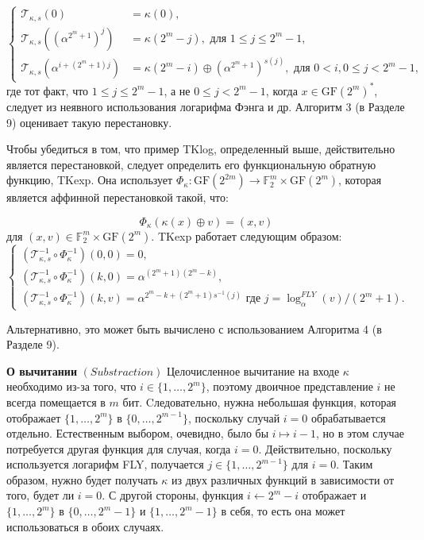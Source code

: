 $$
\begin{cases}
  \mathscr{T}_{\kappa, s}(0) & =\kappa(0), \\
  \mathscr{T}_{\kappa, s}\left(\left(\alpha^{2^m+1}\right)^j\right) & =\kappa\left(2^m-j\right), \text { для } 1 \leq j \leq 2^m-1, \\
  \mathscr{T}_{\kappa, s}\left(\alpha^{i+\left(2^m+1\right) j}\right) & =\kappa\left(2^m-i\right) \oplus\left(\alpha^{2^m+1}\right)^{s(j)}, \text { для } 0<i, 0 \leq j<2^m-1,
\end{cases}
$$ где тот факт, что \(1 \leq j \leq 2^m - 1\), а не \(0 \leq j < 2^m - 1\), когда \(x \in \mathrm{GF}(2^m)^*\), следует из неявного использования логарифма Фэнга и др. Алгоритм 3 (в Разделе 9) оценивает такую перестановку.

Чтобы убедиться в том, что пример TKlog, определенный выше, действительно является перестановкой, следует определить его функциональную обратную функцию, TKexp. Она использует \(\Phi_\kappa: \text{GF}(2^{2m}) \rightarrow \mathbb{F}^m_2 \times \text{GF}(2^m)\), которая является аффинной перестановкой такой, что:

\[
\Phi_\kappa(\kappa(x) \oplus v) = (x, v)
\] для \((x, v) \in \mathbb{F}^m_2 \times \text{GF}(2^m)\). TKexp работает следующим образом:
$$
\left\{\begin{array}{l}
  \left(\mathscr{T}_{\kappa, s}^{-1} \circ \Phi_\kappa^{-1}\right)(0,0)=0, \\
  \left(\mathscr{T}_{\kappa, s}^{-1} \circ \Phi_\kappa^{-1}\right)(k, 0)=\alpha^{\left(2^m+1\right)\left(2^m-k\right)}, \\
  \left(\mathscr{T}_{\kappa, s}^{-1} \circ \Phi_\kappa^{-1}\right)(k, v)=\alpha^{2^m-k+\left(2^m+1\right) s^{-1}(j)} \text { где } j=\log _\alpha^{F L Y}(v) /\left(2^m+1\right) .
  \end{array}\right.
$$

Альтернативно, это может быть вычислено с использованием Алгоритма 4 (в Разделе 9).

\textbf{О вычитании} \((Substraction)\) Целочисленное вычитание на входе \(\kappa\) необходимо из-за того, что \(i \in \{1, \ldots, 2^m\}\), поэтому двоичное представление \(i\) не всегда помещается в \(m\) бит. Cледовательно, нужна небольшая функция, которая отображает \(\{1, \ldots, 2^m\}\) в \(\{0, \ldots, 2^{m - 1}\}\), поскольку случай \(i = 0\) обрабатывается отдельно. Естественным выбором, очевидно, было бы \(i \mapsto i - 1\), но в этом случае потребуется другая функция для случая, когда \(i = 0\). Действительно, поскольку используется логарифм FLY, получается \(j \in \{1, \ldots, 2^{m - 1}\}\) для \(i = 0\). Таким образом, нужно будет получать \(\kappa\) из двух различных функций в зависимости от того, будет ли \(i = 0\). С другой стороны, функция \(i \leftarrow 2^m - i\) отображает и \(\{1, \ldots, 2^m\}\) в \(\{0, \ldots, 2^m - 1\}\) и \(\{1, \ldots, 2^m - 1\}\) в себя, то есть она может использоваться в обоих случаях.

